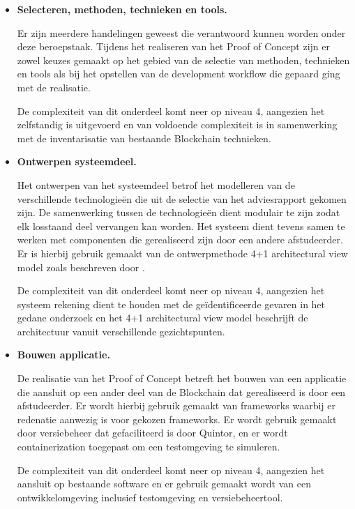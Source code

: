 \begin{itemize}
  \item \textbf{Selecteren, methoden, technieken en tools.}
  
  Er zijn meerdere handelingen geweest die verantwoord kunnen worden onder deze beroepstaak. Tijdens het realiseren van het Proof of Concept zijn er zowel keuzes gemaakt op het gebied van de selectie van methoden, technieken en tools als bij het opstellen van de development workflow die gepaard ging met de realisatie. 
  
  De complexiteit van dit onderdeel komt neer op niveau 4, aangezien het zelfstandig is uitgevoerd en van voldoende complexiteit is in samenwerking met de inventarisatie van bestaande Blockchain technieken.
  \item \textbf{Ontwerpen systeemdeel.}
  
  Het ontwerpen van het systeemdeel betrof het modelleren van de verschillende technologieën die uit de selectie van het adviesrapport gekomen zijn. De samenwerking tussen de technologieën dient modulair te zijn zodat elk losstaand deel vervangen kan worden. Het systeem dient tevens samen te werken met componenten die gerealiseerd zijn door een andere afstudeerder. Er is hierbij gebruik gemaakt van de ontwerpmethode 4+1 architectural view model zoals beschreven door \cite{kruchten19954+}. 
  
  De complexiteit van dit onderdeel komt neer op niveau 4, aangezien het systeem rekening dient te houden met de geïdentificeerde gevaren in het gedane onderzoek en het 4+1 architectural view model beschrijft de architectuur vanuit verschillende gezichtspunten.

  \item \textbf{Bouwen applicatie.}

  De realisatie van het Proof of Concept betreft het bouwen van een applicatie die aansluit op een ander deel van de Blockchain dat gerealiseerd is door een afstudeerder. Er wordt hierbij gebruik gemaakt van frameworks waarbij er redenatie aanwezig is voor gekozen frameworks. Er wordt gebruik gemaakt door versiebeheer dat gefaciliteerd is door Quintor, en er wordt containerization toegepast om een testomgeving te simuleren.

  De complexiteit van dit onderdeel komt neer op niveau 4, aangezien het aansluit op bestaande software en er gebruik gemaakt wordt van een ontwikkelomgeving inclusief testomgeving en versiebeheertool.

\end{itemize}



